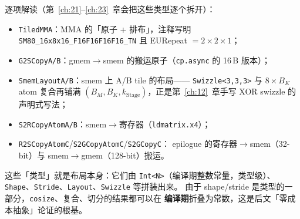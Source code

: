 逐项解读（第~\ref{ch:21}--\ref{ch:23}~章会把这些类型逐个拆开）：

\begin{itemize}
  \item \texttt{TiledMMA}：MMA 的「原子 + 排布」，注释写明
        \texttt{SM80\_\allowbreak{}16x8x16\_\allowbreak{}F16\allowbreak{}F16\allowbreak{}F16\allowbreak{}F16\_\allowbreak{}TN} 且 EURepeat $=2\times2\times1$；
  \item \texttt{G2SCopyA/B}：gmem$\to$smem 的搬运原子（\texttt{cp.async}
        的 16\,B 版本）；
  \item \texttt{Smem\allowbreak{}Layout\allowbreak{}A/\allowbreak{}B}：smem 上 A/B tile 的布局——
        \texttt{Swizzle\allowbreak{}<3,\allowbreak{}3,\allowbreak{}3>} 与 $8\times B_K$ atom 复合再铺满
        $(B_M,B_K,k_{\mathrm{Stage}})$，正是第~\ref{ch:12}~章手写 XOR swizzle 的
        声明式写法；
  \item \texttt{S2\allowbreak{}RCopy\allowbreak{}Atom\allowbreak{}A/\allowbreak{}B}：smem$\to$寄存器（\texttt{ldmatrix.x4}）；
  \item \texttt{R2\allowbreak{}SCopy\allowbreak{}Atom\allowbreak{}C}/\texttt{S2\allowbreak{}GCopy\allowbreak{}Atom\allowbreak{}C}/\texttt{S2GCopyC}：
        epilogue 的寄存器$\to$smem（32-bit）与 smem$\to$gmem（128-bit）搬运。
\end{itemize}

这些「类型」就是布局本身：它们由 \texttt{Int<N>}（编译期整数常量，类型级）、
\texttt{Shape}、\texttt{Stride}、\texttt{Layout}、\texttt{Swizzle} 等拼装出来。
由于 shape/stride 是类型的一部分，\texttt{cosize}、复合、切分的结果都可以在
\textbf{编译期}折叠为常数，这是后文「零成本抽象」论证的根基。

